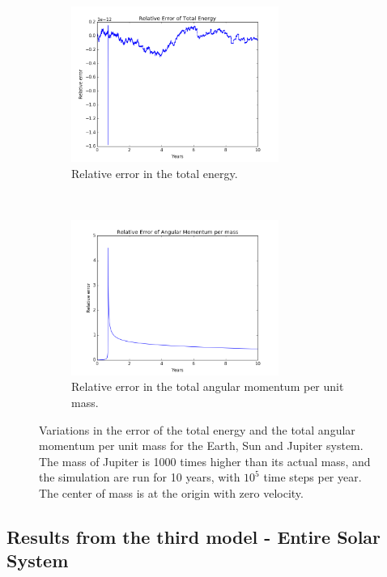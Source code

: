 \documentclass[a4paper, 10pt]{article}
\begin{document}
\begin{figure}[t!]
    \centering
    \begin{subfigure}[t]{0.5\textwidth}
        \centering
        \includegraphics[height=2.0in]{relErrEnSEJ.png}
        \caption{Relative error in the total energy.}
    \end{subfigure}%
    ~ 
    \begin{subfigure}[t]{0.5\textwidth}
        \centering
        \includegraphics[height=2.0in]{relErrMomSEJ.png}
        \caption{Relative error in the total angular momentum per unit mass.}
    \end{subfigure}
    \caption{Variations in the error of the total energy and the total angular momentum per unit mass for the Earth, Sun and Jupiter system. The mass of Jupiter is 1000 times higher than its actual mass, and the simulation are run for 10 years, with $10^5$ time steps per year. The center of mass is at the origin with zero velocity.}\label{fig:Energy_jupiter_1000}
\end{figure}


\subsection{Results from the third model - Entire Solar System}
\end{document}
